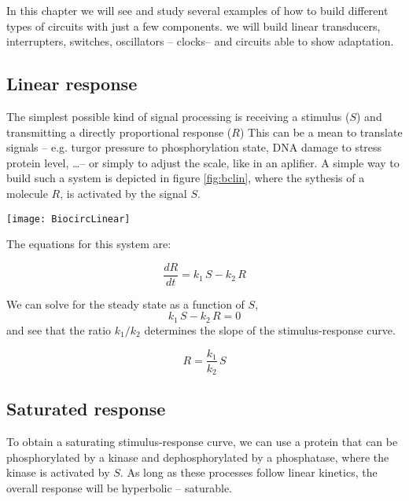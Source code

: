 In this chapter we will see and study several examples of how to build different types of circuits with just a few components. we will build linear transducers, interrupters, switches, oscillators -- clocks-- and circuits able to show adaptation.

\subsection{Linear response}
The simplest possible kind of signal processing is receiving a stimulus ($S$) and transmitting a directly proportional response ($R$) This can be a mean to translate signals -- e.g.  turgor pressure to phosphorylation state, DNA damage to stress protein level, \dots -- or simply to adjust the scale, like in an aplifier. A simple way to build such a system  is depicted in figure \ref{fig:bclin}, where the sythesis of a molecule $R$, is activated by the signal $S$.

\begin{marginfigure}
	\begin{center}
		\texttt{[image: BiocircLinear]}
	\end{center}
	\caption{ ... }
	\label{fig:bclin}
\end{marginfigure}

The equations for this system are:

\begin{equation}
	\frac{dR}{dt}= k_1 \, S - k_2 \, R
\end{equation}

We can solve for the steady state as a function of $S$,
\begin{equation}
	k_1 \, S - k_2 \, R = 0
\end{equation}
and see that the ratio $k_1/k_2$ determines the slope of the stimulus-response curve.

\begin{equation}
	R   = \frac{k_1}{k_2} \, S
\end{equation}

\subsection{Saturated response}
To obtain a saturating stimulus-response curve, we can use a protein that can be phosphorylated by a kinase and dephosphorylated by a phosphatase, where the kinase is activated by $S$. As long as these processes follow linear kinetics, the overall response will be hyperbolic -- saturable.
 
